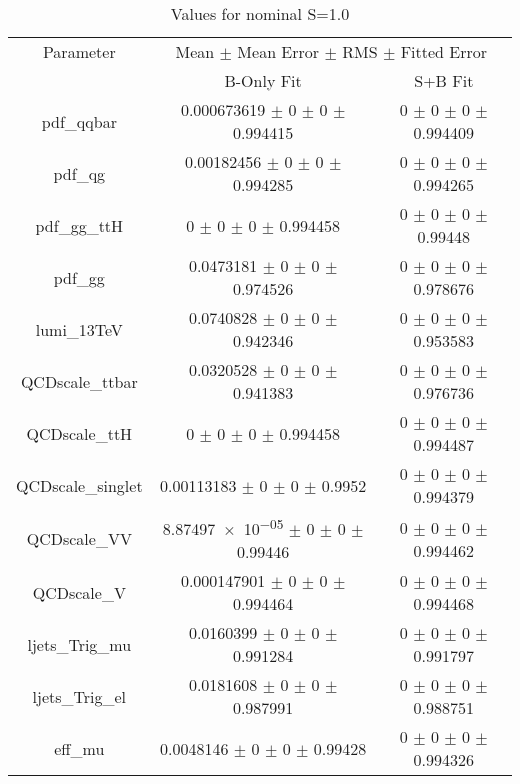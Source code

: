 \begin{table}
\centering
\caption{Values for nominal S=1.0}
\begin{tabular}{ccc}
\toprule
Parameter 	& \multicolumn{2}{c}{Mean $\pm$ Mean Error $\pm$ RMS $\pm$ Fitted Error}\\
 	& B-Only Fit & S+B Fit\\
\midrule
pdf\_qqbar 	& \num{0.000673619} $\pm$ \num{0} $\pm$ \num{0} $\pm$ \num{0.994415} 	& \num{0} $\pm$ \num{0} $\pm$ \num{0} $\pm$ \num{0.994409}\\
pdf\_qg 	& \num{0.00182456} $\pm$ \num{0} $\pm$ \num{0} $\pm$ \num{0.994285} 	& \num{0} $\pm$ \num{0} $\pm$ \num{0} $\pm$ \num{0.994265}\\
pdf\_gg\_ttH 	& \num{0} $\pm$ \num{0} $\pm$ \num{0} $\pm$ \num{0.994458} 	& \num{0} $\pm$ \num{0} $\pm$ \num{0} $\pm$ \num{0.99448}\\
pdf\_gg 	& \num{0.0473181} $\pm$ \num{0} $\pm$ \num{0} $\pm$ \num{0.974526} 	& \num{0} $\pm$ \num{0} $\pm$ \num{0} $\pm$ \num{0.978676}\\
lumi\_13TeV 	& \num{0.0740828} $\pm$ \num{0} $\pm$ \num{0} $\pm$ \num{0.942346} 	& \num{0} $\pm$ \num{0} $\pm$ \num{0} $\pm$ \num{0.953583}\\
QCDscale\_ttbar 	& \num{0.0320528} $\pm$ \num{0} $\pm$ \num{0} $\pm$ \num{0.941383} 	& \num{0} $\pm$ \num{0} $\pm$ \num{0} $\pm$ \num{0.976736}\\
QCDscale\_ttH 	& \num{0} $\pm$ \num{0} $\pm$ \num{0} $\pm$ \num{0.994458} 	& \num{0} $\pm$ \num{0} $\pm$ \num{0} $\pm$ \num{0.994487}\\
QCDscale\_singlet 	& \num{0.00113183} $\pm$ \num{0} $\pm$ \num{0} $\pm$ \num{0.9952} 	& \num{0} $\pm$ \num{0} $\pm$ \num{0} $\pm$ \num{0.994379}\\
QCDscale\_VV 	& \num{8.87497e-05} $\pm$ \num{0} $\pm$ \num{0} $\pm$ \num{0.99446} 	& \num{0} $\pm$ \num{0} $\pm$ \num{0} $\pm$ \num{0.994462}\\
QCDscale\_V 	& \num{0.000147901} $\pm$ \num{0} $\pm$ \num{0} $\pm$ \num{0.994464} 	& \num{0} $\pm$ \num{0} $\pm$ \num{0} $\pm$ \num{0.994468}\\
ljets\_Trig\_mu 	& \num{0.0160399} $\pm$ \num{0} $\pm$ \num{0} $\pm$ \num{0.991284} 	& \num{0} $\pm$ \num{0} $\pm$ \num{0} $\pm$ \num{0.991797}\\
ljets\_Trig\_el 	& \num{0.0181608} $\pm$ \num{0} $\pm$ \num{0} $\pm$ \num{0.987991} 	& \num{0} $\pm$ \num{0} $\pm$ \num{0} $\pm$ \num{0.988751}\\
eff\_mu 	& \num{0.0048146} $\pm$ \num{0} $\pm$ \num{0} $\pm$ \num{0.99428} 	& \num{0} $\pm$ \num{0} $\pm$ \num{0} $\pm$ \num{0.994326}\\

\end{tabular}
\end{table}
